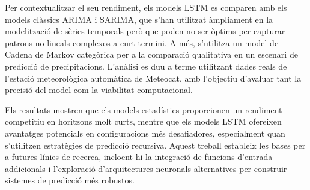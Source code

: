 \documentclass[../main.tex]{subfiles}
\begin{document}
Per contextualitzar el seu rendiment, els models LSTM es comparen amb els models clàssics ARIMA i SARIMA, que s'han utilitzat àmpliament en la modelització de sèries temporals però que poden no ser òptims per capturar patrons no lineals complexos a curt termini. A més, s'utilitza un model de Cadena de Markov categòrica per a la comparació qualitativa en un escenari de predicció de precipitacions. L'anàlisi es duu a terme utilitzant dades reals de l'estació meteorològica automàtica de Meteocat, amb l'objectiu d'avaluar tant la precisió del model com la viabilitat computacional.

Els resultats mostren que els models estadístics proporcionen un rendiment competitiu en horitzons molt curts, mentre que els models LSTM ofereixen avantatges potencials en configuracions més desafiadores, especialment quan s'utilitzen estratègies de predicció recursiva. Aquest treball estableix les bases per a futures línies de recerca, incloent-hi la integració de funcions d'entrada addicionals i l'exploració d'arquitectures neuronals alternatives per construir sistemes de predicció més robustos.

\end{document}
